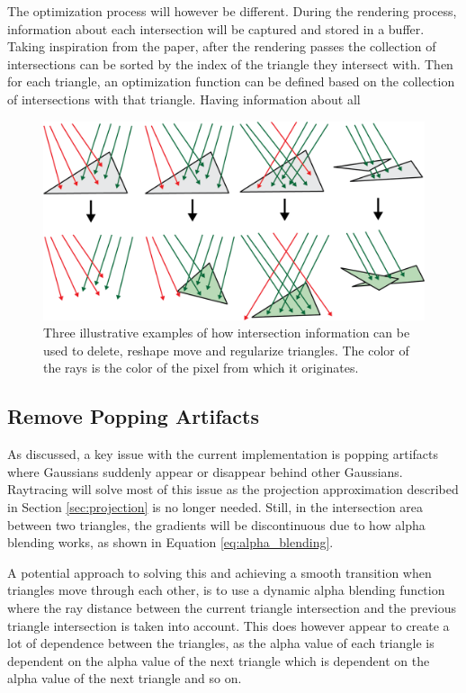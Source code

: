 The optimization process will however be different.
During the rendering process, information about each intersection will be captured and stored in a buffer.
Taking inspiration from the paper, after the rendering passes the collection of intersections can be sorted by the index of the triangle they intersect with.
Then for each triangle, an optimization function can be defined based on the collection of intersections with that triangle.
Having information about all



\begin{figure}
    \centering
    \includegraphics[width=\linewidth]{images/optimization.png}
    \caption{Three illustrative examples of how intersection information can be used to delete, reshape move and regularize triangles. The color of the rays is the color of the pixel from which it originates.}
    \label{fig:optimization}
\end{figure}

\subsection{Remove Popping Artifacts}
As discussed, a key issue with the current implementation is popping artifacts where Gaussians suddenly appear or disappear behind other Gaussians.
Raytracing will solve most of this issue as the projection approximation described in Section \ref{sec:projection} is no longer needed.
Still, in the intersection area between two triangles, the gradients will be discontinuous due to how alpha blending works, as shown in Equation \ref{eq:alpha_blending}.

A potential approach to solving this and achieving a smooth transition when triangles move through each other,
is to use a dynamic alpha blending function where the ray distance between the current triangle intersection and the previous triangle intersection is taken into account.
This does however appear to create a lot of dependence between the triangles, as the alpha value of each triangle is dependent on the alpha value of the next triangle which is dependent on the alpha value of the next triangle and so on.


